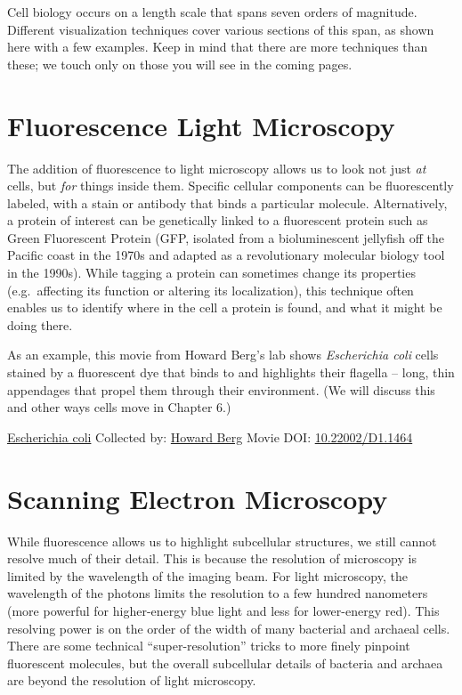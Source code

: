 \documentclass[]{tufte-book}
\begin{document}
Cell biology occurs on a length scale that spans seven orders of magnitude. Different visualization techniques cover various sections of this span, as shown here with a few examples. Keep in mind that there are more techniques than these; we touch only on those you will see in the coming pages.

\hypertarget{fluorescence-light-microscopy}{%
\section{Fluorescence Light Microscopy}\label{fluorescence-light-microscopy}}

The addition of fluorescence to light microscopy allows us to look not just \emph{at} cells, but \emph{for} things inside them. Specific cellular components can be fluorescently labeled, with a stain or antibody that binds a particular molecule. Alternatively, a protein of interest can be genetically linked to a fluorescent protein such as Green Fluorescent Protein (GFP, isolated from a bioluminescent jellyfish off the Pacific coast in the 1970s and adapted as a revolutionary molecular biology tool in the 1990s). While tagging a protein can sometimes change its properties (e.g.~affecting its function or altering its localization), this technique often enables us to identify where in the cell a protein is found, and what it might be doing there.

As an example, this movie from Howard Berg's lab \citep{bergInternet} \citep{turner2000} shows \emph{Escherichia coli} cells stained by a fluorescent dye that binds to and highlights their flagella -- long, thin appendages that propel them through their environment. (We will discuss this and other ways cells move in Chapter 6.)



\hypertarget{htmlwidget-82bc4012176f72f1121f}{}

\label{fig:1-2}\protect\hyperlink{tree}{Escherichia coli} Collected by: \protect\hyperlink{howard_berg}{Howard Berg} Movie DOI: \href{https://doi.org/10.22002/D1.1464}{10.22002/D1.1464}

\hypertarget{scanning-electron-microscopy}{%
\section{Scanning Electron Microscopy}\label{scanning-electron-microscopy}}

While fluorescence allows us to highlight subcellular structures, we still cannot resolve much of their detail. This is because the resolution of microscopy is limited by the wavelength of the imaging beam. For light microscopy, the wavelength of the photons limits the resolution to a few hundred nanometers (more powerful for higher-energy blue light and less for lower-energy red). This resolving power is on the order of the width of many bacterial and archaeal cells. There are some technical ``super-resolution'' tricks to more finely pinpoint fluorescent molecules, but the overall subcellular details of bacteria and archaea are beyond the resolution of light microscopy.
\end{document}
